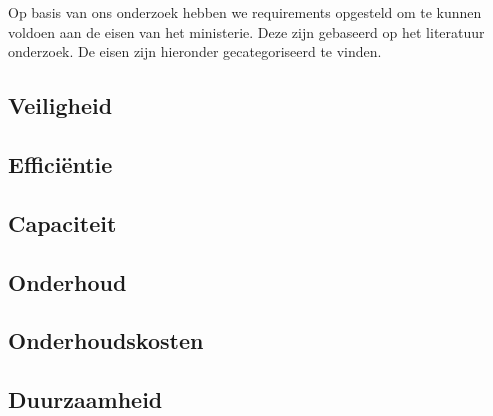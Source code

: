 \documentclass[../verslag.tex]{subfiles}
\begin{document}
Op basis van ons onderzoek hebben we requirements opgesteld om te kunnen voldoen aan de eisen van het ministerie. Deze zijn gebaseerd op het literatuur onderzoek. De eisen zijn hieronder gecategoriseerd te vinden.

\subsection{Veiligheid}

\subsection{Efficiëntie}

\subsection{Capaciteit}

\subsection{Onderhoud}

\subsection{Onderhoudskosten}

\subsection{Duurzaamheid}
\end{document}
